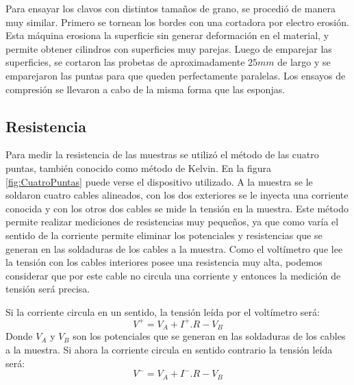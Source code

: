 \documentclass[a4paper,12pt,fleqn,twoside,openany]{book}
\begin{document}
 

Para ensayar los clavos con distintos tamaños de grano, se procedió de manera muy similar. Primero se tornean los bordes con una cortadora por electro erosión. Esta máquina erosiona la superficie sin generar deformación en el material, y permite obtener cilindros con superficies muy parejas. Luego de emparejar las superficies, se cortaron las probetas de aproximadamente $25 mm$ de largo y se emparejaron las puntas para que queden perfectamente paralelas. 
Los ensayos de compresión se llevaron a cabo de la misma forma que las esponjas. 
 

\subsection{Resistencia} \label{CuatroPuntas}




Para medir la resistencia de las muestras se utilizó el método de las cuatro puntas, también conocido como método de Kelvin. En la figura 
\ref{fig:CuatroPuntas} puede 
verse el dispositivo utilizado. A la muestra se le soldaron cuatro cables alineados, con los dos exteriores se le inyecta una corriente conocida y con los 
otros dos cables se mide la tensión en la muestra. Este método permite realizar mediciones de resistencias muy pequeños, ya que como varía
el sentido de la corriente permite eliminar los potenciales y resistencias que se generan en las soldaduras de los cables a la muestra.
Como el voltímetro que lee la tensión con los cables interiores posee una resistencia muy alta, podemos considerar que por este cable no circula una corriente
y entonces la medición de tensión será precisa. 

Si la corriente circula en un sentido, la tensión leída por el voltímetro será:
\begin{equation}
 V^+= V_A +I^+ . R - V_B 
\end{equation}
Donde $V_A$ y $V_B$ son los potenciales que se generan en las soldaduras de los cables a la muestra. Si ahora la corriente circula en sentido contrario la tensión leída será:
\begin{equation}
 V^-= V_A +I^- . R - V_B 
\end{equation}
\end{document}
